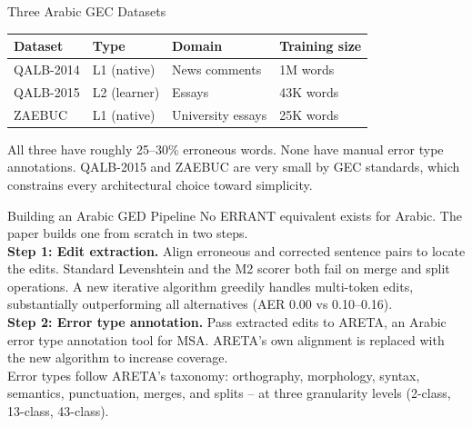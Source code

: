 \documentclass[aspectratio=169]{beamer}
\begin{document}

\begin{frame}{Three Arabic GEC Datasets}
  \begin{center}
  \begin{tabular}{llll}
    \toprule
    \textbf{Dataset} & \textbf{Type} & \textbf{Domain} & \textbf{Training size} \\
    \midrule
    QALB-2014 & L1 (native) & News comments & 1M words \\
    QALB-2015 & L2 (learner) & Essays & 43K words \\
    ZAEBUC    & L1 (native) & University essays & 25K words \\
    \bottomrule
  \end{tabular}
  \end{center}

  \vspace{1em}
  All three have roughly 25--30\% erroneous words.
  None have manual error type annotations.
  QALB-2015 and ZAEBUC are very small by GEC standards,
  which constrains every architectural choice toward simplicity.
\end{frame}


\begin{frame}{Building an Arabic GED Pipeline}
  No ERRANT equivalent exists for Arabic.
  The paper builds one from scratch in two steps.\\[1.5em]

  \textbf{Step 1: Edit extraction.}
  Align erroneous and corrected sentence pairs to locate the edits.
  Standard Levenshtein and the M2 scorer both fail on merge and split
  operations. A new iterative algorithm greedily handles multi-token edits,
  substantially outperforming all alternatives (AER 0.00 vs 0.10--0.16).\\[1em]

  \textbf{Step 2: Error type annotation.}
  Pass extracted edits to ARETA, an Arabic error type annotation tool for MSA.
  ARETA's own alignment is replaced with the new algorithm to increase coverage.\\[1em]

  Error types follow ARETA's taxonomy: orthography, morphology, syntax,
  semantics, punctuation, merges, and splits -- at three granularity levels
  (2-class, 13-class, 43-class).
\end{frame}
\end{document}

